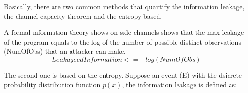 Basically, there are two common methods that quantify the information leakage, 
the channel capacity theorem and the entropy-based.

A formal information theory shows on side-channels shows that the max leakage of 
the program equals to the log of the number of possible distinct observations (NumOfObs) 
that an attacker can make.
\begin{equation}
    Leakageed Information <= - log(NumOfObs)
\end{equation}

The second one is based on the entropy. Suppose an event (E) with the dsicrete probability
distribution function $p(x)$, the information leakage is defined as:
\begin{equation}
    
\end{equation}